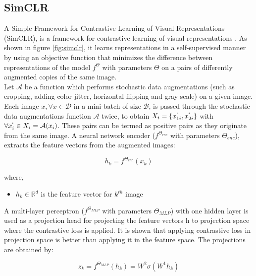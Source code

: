 \subsection{SimCLR}
A Simple Framework for Contrastive Learning of Visual Representations (SimCLR), is a framework for contrastive learning of visual representations \cite{chen2020}. As shown in figure \ref{fig:simclr}, it learns representations in a self-supervised manner by using an objective function that minimizes the difference between representations of the model $f^{\Theta}$ with parameters $\Theta$ on a pairs of differently augmented copies of the same image. \\
Let $\mathcal{A}$ be a function which performs stochastic data augmentations (such as cropping, adding color jitter, horizontal flipping and gray scale) on a given image. Each image $x, \forall x \in \mathcal{D}$ in a mini-batch of size $\mathcal{B}$, is passed through the stochastic data augmentations function $\mathcal{A}$ twice, to obtain $X_i = \{x_{1i}^{`}, x_{2i}^{`}\}$ with $\forall x_i^{`} \in X_i = \mathcal{A}(x_i)$. These pairs can be termed as positive pairs as they originate from the same image. A neural network encoder ($f^{\Theta_{enc}}$ with parameters $\Theta_{enc}$), extracts the feature vectors from the augmented images:

\begin{equation}
    \label{equation:simclr_encoder}
    h_k = f^{\Theta_{enc}}(x_k)
\end{equation}

where,
\begin{itemize}[label={}]
  \setlength\itemsep{0em}
  \item $h_k \in \mathbb{R}^{d}$ is the feature vector for $k^{th}$ image
\end{itemize}

A multi-layer perceptron ($f^{\Theta_{MLP}}$ with parameters $\Theta_{MLP}$) with one hidden layer is used as a projection head for projecting the feature vectors h to projection space where the contrastive loss is applied. It is shown \cite{chen2020} that applying contrastive loss in projection space is better than applying it in the feature space. The projections are obtained by:

\begin{equation}
    \label{equation:simclr_mlp}
    z_k = f^{\Theta_{MLP}}(h_k) = W^{2}\sigma(W^{1}h_k)
\end{equation}

